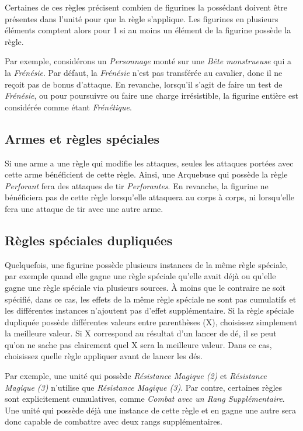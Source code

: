Certaines de ces règles précisent combien de figurines la possédant doivent être présentes dans l'unité pour que la règle s'applique. Les figurines en plusieurs éléments comptent alors pour 1 si au moins un élément de la figurine possède la règle.

Par exemple, considérons un \emph{Personnage} monté sur une \emph{Bête monstrueuse} qui a la \emph{Frénésie}. Par défaut, la \emph{Frénésie} n'est pas transférée au cavalier, donc il ne reçoit pas de bonus d'attaque. En revanche, lorsqu'il s'agit de faire un test de \emph{Frénésie}, ou pour poursuivre ou faire une charge irrésistible, la figurine entière est considérée comme étant \emph{Frénétique}.

\subsection{Armes et règles spéciales}

Si une arme a une règle qui modifie les attaques, seules les attaques portées avec cette arme bénéficient de cette règle. Ainsi, une Arquebuse qui possède la règle \emph{Perforant} fera des attaques de tir \emph{Perforantes}. En revanche, la figurine ne bénéficiera pas de cette règle lorsqu'elle attaquera au corps à corps, ni lorsqu'elle fera une attaque de tir avec une autre arme.

\subsection{Règles spéciales dupliquées}

Quelquefois, une figurine possède plusieurs instances de la même règle spéciale, par exemple quand elle gagne une règle spéciale qu'elle avait déjà ou qu'elle gagne une règle spéciale via plusieurs sources. À moins que le contraire ne soit spécifié, dans ce cas, les effets de la même règle spéciale ne sont pas cumulatifs et les différentes instances n'ajoutent pas d'effet supplémentaire. Si la règle spéciale dupliquée possède différentes valeurs entre parenthèses (X), choisissez simplement la meilleure valeur. Si X correspond au résultat d'un lancer de dé, il se peut qu'on ne sache pas clairement quel X sera la meilleure valeur. Dans ce cas, choisissez quelle règle appliquer avant de lancer les dés.

Par exemple, une unité qui possède \emph{Résistance Magique (2)} et \emph{Résistance Magique (3)} n'utilise que \emph{Résistance Magique (3)}. Par contre, certaines règles sont explicitement cumulatives, comme \emph{Combat avec un Rang Supplémentaire}. Une unité qui possède déjà une instance de cette règle et en gagne une autre sera donc capable de combattre avec deux rangs supplémentaires. 
